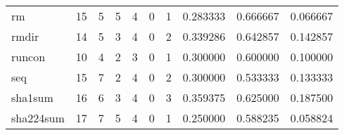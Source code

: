 \begin{tabular}{lrrrrrrrrr}
rm        &                                      15 &                                                  5 &                                                  5 &                                                  4 &                                                  0 &                                                  1 &                                           0.283333 &                               0.666667 &                             0.066667 \\
rmdir     &                                      14 &                                                  5 &                                                  3 &                                                  4 &                                                  0 &                                                  2 &                                           0.339286 &                               0.642857 &                             0.142857 \\
runcon    &                                      10 &                                                  4 &                                                  2 &                                                  3 &                                                  0 &                                                  1 &                                           0.300000 &                               0.600000 &                             0.100000 \\
seq       &                                      15 &                                                  7 &                                                  2 &                                                  4 &                                                  0 &                                                  2 &                                           0.300000 &                               0.533333 &                             0.133333 \\
sha1sum   &                                      16 &                                                  6 &                                                  3 &                                                  4 &                                                  0 &                                                  3 &                                           0.359375 &                               0.625000 &                             0.187500 \\
sha224sum &                                      17 &                                                  7 &                                                  5 &                                                  4 &                                                  0 &                                                  1 &                                           0.250000 &                               0.588235 &                             0.058824 \\

\end{tabular}

